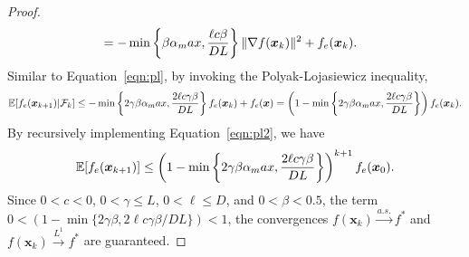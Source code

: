 \documentclass[10pt,a4paper]{amsart}
\newcommand{\Lip}{L}
\newcommand{\alphaMax}{\alpha_\textup{max}}
\begin{document}
\begin{proof}
\begin{equation}
\begin{aligned}
&= -\min\left\{\beta \alphaMax,\frac{\ell c\beta}{D\Lip}\right\}\lVert \nabla f(\bm x_k)\rVert^2 + f_e(\bm x_k).
\end{aligned}
\end{equation}
Similar to Equation~\eqref{eqn:pl}, by invoking the Polyak-Lojasiewicz inequality,
\begin{equation}
\label{eqn:pl2}
\begin{aligned}
\mathbb{E}[f_e(\bm x_{k+1})\vert\mathcal{F}_k] 
\leq -\min\left\{2\gamma\beta \alphaMax,\frac{2\ell c\gamma\beta}{D\Lip}\right\}f_e(\bm x_k) + f_e(\bm x) 
= \left(1-\min\left\{2\gamma\beta \alphaMax,\frac{2\ell c\gamma\beta}{D\Lip}\right\}\right)f_e(\bm x_k).
\end{aligned}
\end{equation}
By recursively implementing Equation~\eqref{eqn:pl2}, we have
\begin{equation}
\label{eq:rec2}
\mathbb{E}[f_e(\bm x_{k+1})]
\leq \left(1-\min\left\{2\gamma\beta \alphaMax,\frac{2\ell c\gamma\beta}{D\Lip}\right\}\right)^{k+1}f_e(\bm x_0).
\end{equation}
Since $0 < c < 0$, $0 < \gamma\leq\Lip$, $0 < \ell\leq D$, and $0 < \beta< 0.5$, the term $0 < \left(1-\min\{2\gamma\beta,2\ell c\gamma\beta/D\Lip\}\right) < 1$, the convergences $f(\bm x_k)\overset{a.s.}{\to}f^*$ and $f(\bm x_k)\overset{L^1}{\to}f^*$ are guaranteed.
\end{proof}
\end{document}
